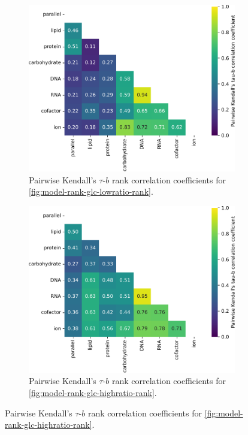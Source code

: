 \begin{figure}
  \begin{subfigure}[t]{0.45\textwidth}
  \centering
    \includegraphics[width=\linewidth]{CompareEnzUse_glc16p89_pyrUnres_ammUnres_2.pdf}
    \caption{
      Pairwise Kendall's $\tau$-$b$ rank correlation coefficients for \ref{fig:model-rank-glc-lowratio-rank}.
    }
    \label{fig:model-rank-glc-lowratio-kendall}
  \end{subfigure}%
  \begin{subfigure}[t]{0.45\textwidth}
  \centering
    \includegraphics[width=\linewidth]{CompareEnzUse_glc01p69_pyrUnres_amm01p05_2.pdf}
    \caption{
      Pairwise Kendall's $\tau$-$b$ rank correlation coefficients for \ref{fig:model-rank-glc-highratio-rank}.
    }
    \label{fig:model-rank-glc-highratio-kendall}
  \end{subfigure}


\end{figure}
